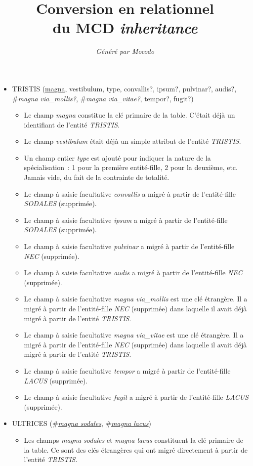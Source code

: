 \documentclass[a4paper]{article}
\title{Conversion en relationnel\\du MCD \emph{inheritance}}
\author{\emph{Généré par Mocodo}}
\newcommand{\relat}[1]{\textsc{#1}}
\newcommand{\attr}[1]{#1}
\newcommand{\prim}[1]{\uline{#1}}
\newcommand{\foreign}[1]{\#\textsl{#1}}
\begin{document}
\maketitle

\begin{itemize}
  \item \relat{TRISTIS} (\prim{magna}, \attr{vestibulum}, \attr{type}, \attr{convallis?}, \attr{ipsum?}, \attr{pulvinar?}, \attr{audis?}, \foreign{magna via_mollis?}, \foreign{magna via_vitae?}, \attr{tempor?}, \attr{fugit?})
  \begin{itemize}
    \item Le champ \emph{magna} constitue la clé primaire de la table. C'était déjà un identifiant de l'entité \emph{TRISTIS}.
    \item Le champ \emph{vestibulum} était déjà un simple attribut de l'entité \emph{TRISTIS}.
    \item Un champ entier \emph{type} est ajouté pour indiquer la nature de la spécialisation : 1 pour la première entité-fille, 2 pour la deuxième, etc. Jamais vide, du fait de la contrainte de totalité.
    \item Le champ à saisie facultative \emph{convallis} a migré à partir de l'entité-fille \emph{SODALES} (supprimée).
    \item Le champ à saisie facultative \emph{ipsum} a migré à partir de l'entité-fille \emph{SODALES} (supprimée).
    \item Le champ à saisie facultative \emph{pulvinar} a migré à partir de l'entité-fille \emph{NEC} (supprimée).
    \item Le champ à saisie facultative \emph{audis} a migré à partir de l'entité-fille \emph{NEC} (supprimée).
    \item Le champ à saisie facultative \emph{magna via_mollis} est une clé étrangère. Il a migré à partir de l'entité-fille \emph{NEC} (supprimée) dans laquelle il avait déjà migré à partir de l'entité \emph{TRISTIS}.
    \item Le champ à saisie facultative \emph{magna via_vitae} est une clé étrangère. Il a migré à partir de l'entité-fille \emph{NEC} (supprimée) dans laquelle il avait déjà migré à partir de l'entité \emph{TRISTIS}.
    \item Le champ à saisie facultative \emph{tempor} a migré à partir de l'entité-fille \emph{LACUS} (supprimée).
    \item Le champ à saisie facultative \emph{fugit} a migré à partir de l'entité-fille \emph{LACUS} (supprimée).
  \end{itemize}

  \item \relat{ULTRICES} (\foreign{\prim{magna sodales}}, \foreign{\prim{magna lacus}})
  \begin{itemize}
    \item Les champs \emph{magna sodales} et \emph{magna lacus} constituent la clé primaire de la table. Ce sont des clés étrangères qui ont migré directement à partir de l'entité \emph{TRISTIS}.
  \end{itemize}

\end{itemize}
\end{document}

